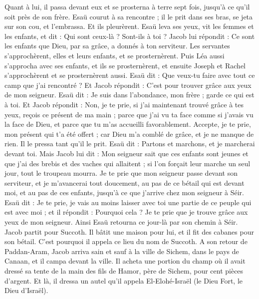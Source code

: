 \begin{multicols}{2}
Quant à lui, il passa devant eux et se prosterna à terre sept fois, jusqu'à ce qu'il soit près de son frère.
Esaü courut à sa rencontre ; il le prit dans ses bras, se jeta sur son cou, et l'embrassa. Et ils pleurèrent.
Esaü leva ses yeux, vit les femmes et les enfants, et dit : Qui sont ceux-là ? Sont-ils à toi ? Jacob lui répondit : Ce sont les enfants que Dieu, par sa grâce, a donnés à ton serviteur.
Les servantes s'approchèrent, elles et leurs enfants, et se prosternèrent.
Puis Léa aussi s'approcha avec ses enfants, et ils se prosternèrent, et ensuite Joseph et Rachel s'approchèrent et se prosternèrent aussi.
Esaü dit : Que veux-tu faire avec tout ce camp que j'ai rencontré ? Et Jacob répondit : C'est pour trouver grâce aux yeux de mon seigneur.
Esaü dit : Je suis dans l'abondance, mon frère ; garde ce qui est à toi.
Et Jacob répondit : Non, je te prie, si j'ai maintenant trouvé grâce à tes yeux, reçois ce présent de ma main ; parce que j'ai vu ta face comme si j'avais vu la face de Dieu, et parce que tu m'as accueilli favorablement.
Accepte, je te prie, mon présent qui t'a été offert ; car Dieu m'a comblé de grâce, et je ne manque de rien. Il le pressa tant qu'il le prit.
Esaü dit : Partons et marchons, et je marcherai devant toi.
Mais Jacob lui dit : Mon seigneur sait que ces enfants sont jeunes et que j'ai des brebis et des vaches qui allaitent ; si l'on forçait leur marche un seul jour, tout le troupeau mourra.
Je te prie que mon seigneur passe devant son serviteur, et je m'avancerai tout doucement, au pas de ce bétail qui est devant moi, et au pas de ces enfants, jusqu'à ce que j'arrive chez mon seigneur à Séir.
Esaü dit : Je te prie, je vais au moins laisser avec toi une partie de ce peuple qui est avec moi ; et il répondit : Pourquoi cela ? Je te prie que je trouve grâce aux yeux de mon seigneur.
Ainsi Esaü retourna ce jour-là par son chemin à Séir.
Jacob partit pour Succoth. Il bâtit une maison pour lui, et il fit des cabanes pour son bétail. C'est pourquoi il appela ce lieu du nom de Succoth.
A son retour de Paddan-Aram, Jacob arriva sain et sauf à la ville de Sichem, dans le pays de Canaan, et il campa devant la ville.
Il acheta une portion du champ où il avait dressé sa tente de la main des fils de Hamor, père de Sichem, pour cent pièces d'argent.
Et là, il dressa un autel qu'il appela El-Elohé-Israël (le Dieu Fort, le Dieu d'Israël).

\end{multicols}
